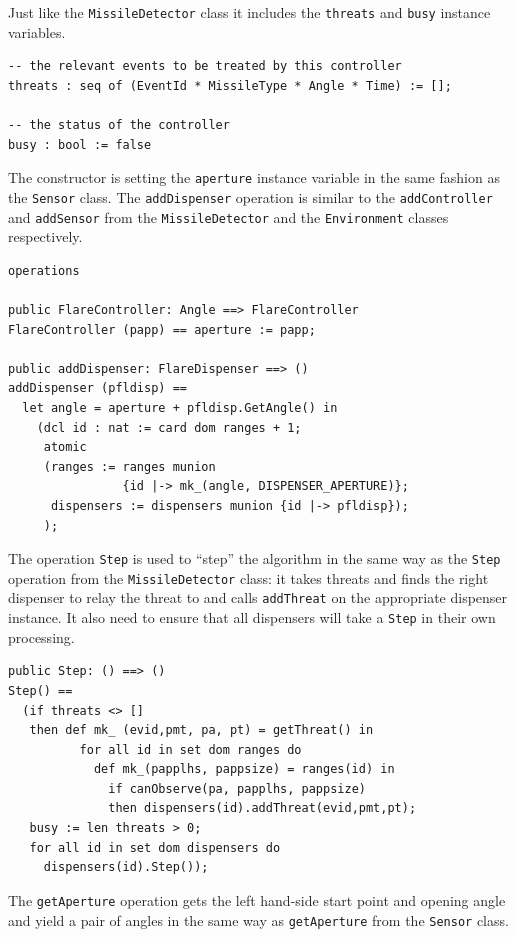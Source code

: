 \documentclass{overturerepchap}
\begin{document}
Just like the \texttt{MissileDetector} class it includes the \texttt{threats} and
\texttt{busy} instance variables.

\begin{lstlisting}
-- the relevant events to be treated by this controller
threats : seq of (EventId * MissileType * Angle * Time) := [];

-- the status of the controller
busy : bool := false
\end{lstlisting}

The constructor is setting the \texttt{aperture} instance variable in the 
same fashion as the \texttt{Sensor} class. The \texttt{addDispenser}
operation is similar to the \texttt{addController} and \texttt{addSensor}
from the \texttt{MissileDetector} and the \texttt{Environment} classes 
respectively.

\begin{lstlisting}
operations

public FlareController: Angle ==> FlareController
FlareController (papp) == aperture := papp;

public addDispenser: FlareDispenser ==> ()
addDispenser (pfldisp) ==
  let angle = aperture + pfldisp.GetAngle() in
    (dcl id : nat := card dom ranges + 1;
     atomic
     (ranges := ranges munion 
                {id |-> mk_(angle, DISPENSER_APERTURE)};
      dispensers := dispensers munion {id |-> pfldisp});
     );
\end{lstlisting}

The operation \texttt{Step} is used to ``step'' the algorithm in the
same way as the \texttt{Step} operation from the \texttt{MissileDetector}
class: it
takes threats and finds the right dispenser to relay the threat to
and calls \texttt{addThreat} on the appropriate dispenser instance. It 
also need to ensure that all dispensers will take a \texttt{Step} in their
own processing.

\begin{lstlisting}
public Step: () ==> ()
Step() ==
  (if threats <> []
   then def mk_ (evid,pmt, pa, pt) = getThreat() in
          for all id in set dom ranges do
            def mk_(papplhs, pappsize) = ranges(id) in
              if canObserve(pa, papplhs, pappsize)
              then dispensers(id).addThreat(evid,pmt,pt);
   busy := len threats > 0;
   for all id in set dom dispensers do
     dispensers(id).Step());
\end{lstlisting}

The \texttt{getAperture} operation gets the left hand-side start point 
and opening angle and yield a pair of angles in the same way as
\texttt{getAperture} from the \texttt{Sensor} class.
\end{document}
